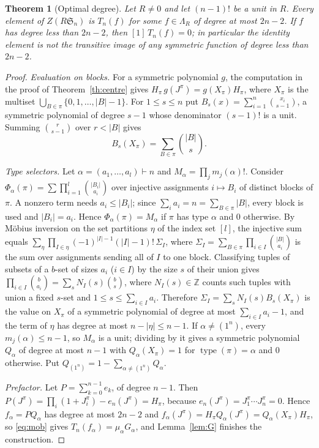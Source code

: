 \documentclass[11pt,a4paper]{article}
\newtheorem{theorem}{Theorem}[section]
\theoremstyle{definition}
\newcommand{\Sn}{\mathfrak S}
\newcommand{\Z}{\mathbb Z}
\DeclareMathOperator{\type}{type}
\begin{document}
\begin{theorem}[Optimal degree]\label{th:degree}
Let $R\ne0$ and let $(n-1)!$ be a unit in $R$. Every element of $Z(R\Sn_n)$ is $T_n(f)$ for some $f\in\Lambda_R$ of degree at most $2n-2$. If $f$ has degree less than $2n-2$, then $[1]\,T_n(f)=0$; in particular the identity element is not the transitive image of any symmetric function of degree less than $2n-2$.
\end{theorem}
\begin{proof}
\emph{Evaluation on blocks.} For a symmetric polynomial $g$, the computation in the proof of Theorem~\ref{th:centre} gives $H_\pi\,g(J^\pi)=g(X_\pi)H_\pi$, where $X_\pi$ is the multiset $\bigcup_{B\in\pi}\{0,1,\ldots,|B|-1\}$. For $1\le s\le n$ put $B_s(x)=\sum_{i=1}^n\binom{x_i}{s-1}$, a symmetric polynomial of degree $s-1$ whose denominator $(s-1)!$ is a unit. Summing $\binom{r}{s-1}$ over $r<|B|$ gives
\[
 B_s(X_\pi)=\sum_{B\in\pi}\binom{|B|}{s}.
\]

\emph{Type selectors.} Let $\alpha=(a_1,\ldots,a_l)\vdash n$ and $M_\alpha=\prod_jm_j(\alpha)!$. Consider $\Phi_\alpha(\pi)=\sum\prod_{i=1}^l\binom{|B_i|}{a_i}$ over injective assignments $i\mapsto B_i$ of distinct blocks of $\pi$. A nonzero term needs $a_i\le|B_i|$; since $\sum_ia_i=n=\sum_{B\in\pi}|B|$, every block is used and $|B_i|=a_i$. Hence $\Phi_\alpha(\pi)=M_\alpha$ if $\pi$ has type $\alpha$ and $0$ otherwise. By M\"obius inversion on the set partitions $\eta$ of the index set $[l]$, the injective sum equals $\sum_\eta\prod_{I\in\eta}(-1)^{|I|-1}(|I|-1)!\,\Sigma_I$, where $\Sigma_I=\sum_{B\in\pi}\prod_{i\in I}\binom{|B|}{a_i}$ is the sum over assignments sending all of $I$ to one block. Classifying tuples of subsets of a $b$-set of sizes $a_i$ ($i\in I$) by the size $s$ of their union gives $\prod_{i\in I}\binom{b}{a_i}=\sum_sN_I(s)\binom bs$, where $N_I(s)\in\Z$ counts such tuples with union a fixed $s$-set and $1\le s\le\sum_{i\in I}a_i$. Therefore $\Sigma_I=\sum_sN_I(s)B_s(X_\pi)$ is the value on $X_\pi$ of a symmetric polynomial of degree at most $\sum_{i\in I}a_i-1$, and the term of $\eta$ has degree at most $n-|\eta|\le n-1$. If $\alpha\ne(1^n)$, every $m_j(\alpha)\le n-1$, so $M_\alpha$ is a unit; dividing by it gives a symmetric polynomial $Q_\alpha$ of degree at most $n-1$ with $Q_\alpha(X_\pi)=1$ for $\type(\pi)=\alpha$ and $0$ otherwise. Put $Q_{(1^n)}=1-\sum_{\alpha\ne(1^n)}Q_\alpha$.

\emph{Prefactor.} Let $P=\sum_{k=0}^{n-1}e_k$, of degree $n-1$. Then $P(J^\pi)=\prod_i(1+J_i^\pi)-e_n(J^\pi)=H_\pi$, because $e_n(J^\pi)=J^\pi_1\cdots J^\pi_n=0$. Hence $f_\alpha=PQ_\alpha$ has degree at most $2n-2$ and $f_\alpha(J^\pi)=H_\pi Q_\alpha(J^\pi)=Q_\alpha(X_\pi)H_\pi$, so \eqref{eq:mob} gives $T_n(f_\alpha)=\mu_\alpha G_\alpha$, and Lemma~\ref{lem:G} finishes the construction.


\end{proof}
\end{document}
